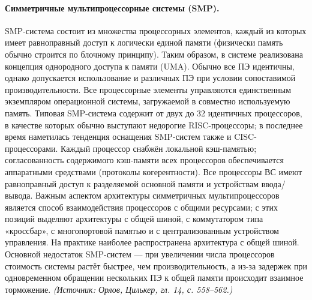 \documentclass[a4paper,12pt]{article}
\begin{document}
\paragraph{Симметричные мультипроцессорные системы (SMP).}
SMP-система состоит из множества процессорных элементов, каждый из которых имеет равноправный доступ к логически единой памяти (физически память обычно строится по блочному принципу). Таким образом, в системе реализована концепция однородного доступа к памяти (UMA). Обычно все ПЭ идентичны, однако допускается использование и различных ПЭ при условии сопоставимой производительности. Все процессорные элементы управляются единственным экземпляром операционной системы, загружаемой в совместно используемую память. Типовая SMP-система содержит от двух до 32 идентичных процессоров, в качестве которых обычно выступают недорогие RISC-процессоры; в последнее время наметилась тенденция оснащения SMP-систем также и CISC-процессорами. Каждый процессор снабжён локальной кэш-памятью; согласованность содержимого кэш-памяти всех процессоров обеспечивается аппаратными средствами (протоколы когерентности). Все процессоры ВС имеют равноправный доступ к разделяемой основной памяти и устройствам ввода/вывода. Важным аспектом архитектуры симметричных мультипроцессоров является способ взаимодействия процессоров с общими ресурсами; с этих позиций выделяют архитектуры с общей шиной, с коммутатором типа «кроссбар», с многопортовой памятью и с централизованным устройством управления. На практике наиболее распространена архитектура с общей шиной. Основной недостаток SMP-систем — при увеличении числа процессоров стоимость системы растёт быстрее, чем производительность, а из-за задержек при одновременном обращении нескольких ПЭ к общей памяти происходит взаимное торможение.
\textit{(Источник: Орлов, Цилькер, гл. 14, с. 558--562.)}
\end{document}
